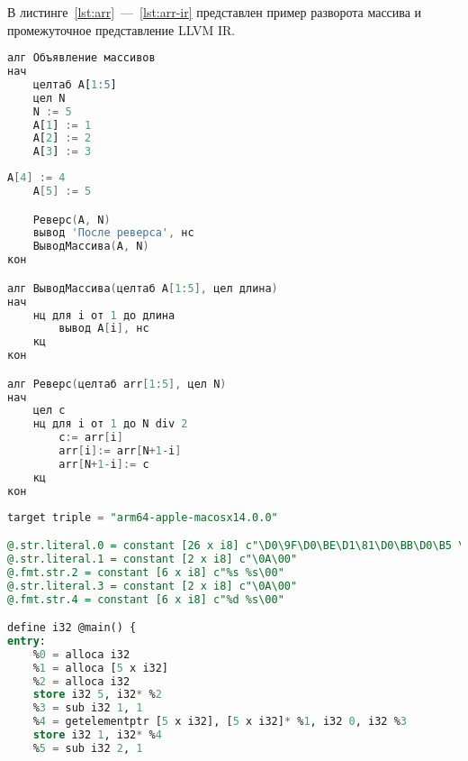 В листинге~\ref{lst:arr}~---~\ref{lst:arr-ir} представлен пример разворота массива и промежуточное представление LLVM IR.

\begin{lstlisting}[language=sql, caption={Пример программы для развтора массива}, label=lst:arr]
алг Объявление массивов
нач
    целтаб A[1:5]
    цел N
    N := 5
    A[1] := 1
    A[2] := 2
    A[3] := 3
\end{lstlisting}

\newpage
\setcounter{lstlisting}{3}
\begin{lstlisting}[language=go, firstnumber=last, caption={Пример программы для развтора массива}]
    A[4] := 4
    A[5] := 5

    Реверс(A, N)
    вывод 'После реверса', нс
    ВыводМассива(A, N)
кон

алг ВыводМассива(целтаб A[1:5], цел длина)
нач
    нц для i от 1 до длина
        вывод A[i], нс
    кц
кон

алг Реверс(целтаб arr[1:5], цел N)
нач
    цел c
    нц для i от 1 до N div 2
        c:= arr[i]
        arr[i]:= arr[N+1-i]
        arr[N+1-i]:= c
    кц
кон
\end{lstlisting}

\begin{lstlisting}[language=sql, caption={Пример промежуточного представления LLVM IR для разворота массива}, label=lst:arr-ir]
target triple = "arm64-apple-macosx14.0.0"

@.str.literal.0 = constant [26 x i8] c"\D0\9F\D0\BE\D1\81\D0\BB\D0\B5 \D1\80\D0\B5\D0\B2\D0\B5\D1\80\D1\81\D0\B0\00"
@.str.literal.1 = constant [2 x i8] c"\0A\00"
@.fmt.str.2 = constant [6 x i8] c"%s %s\00"
@.str.literal.3 = constant [2 x i8] c"\0A\00"
@.fmt.str.4 = constant [6 x i8] c"%d %s\00"

define i32 @main() {
entry:
	%0 = alloca i32
	%1 = alloca [5 x i32]
	%2 = alloca i32
	store i32 5, i32* %2
	%3 = sub i32 1, 1
	%4 = getelementptr [5 x i32], [5 x i32]* %1, i32 0, i32 %3
	store i32 1, i32* %4
	%5 = sub i32 2, 1
\end{lstlisting}

